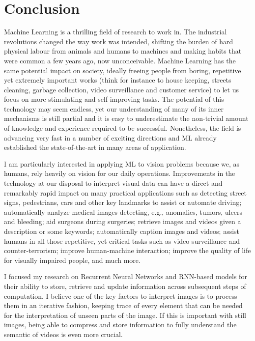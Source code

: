 \chapter{Conclusion}\label{sec:conclusion}

Machine Learning is a thrilling field of research to work in. The industrial
revolutions changed the way work was intended, shifting the burden of hard
physical labour from animals and humans to machines and making habits that were
common a few years ago, now unconceivable. Machine Learning has the same
potential impact on society, ideally freeing people from boring, repetitive
yet extremely important works (think for instance to house keeping, streets
cleaning, garbage collection, video surveillance and customer service) to let
us focus on more stimulating and self-improving tasks. The potential of this
technology may seem endless, yet our understanding of many of its inner
mechanisms is still partial and it is easy to underestimate the non-trivial
amount of knowledge and experience required to be successful.  Nonetheless, the
field is advancing very fast in a number of exciting directions and ML already
established the state-of-the-art in many areas of application.

I am particularly interested in applying ML to vision problems because we, as
humans, rely heavily on vision for our daily operations. Improvements in the
technology at our disposal to interpret visual data can have a direct and
remarkably rapid impact on many practical applications such as detecting
street signs, pedestrians, cars and other key landmarks to assist or automate
driving; automatically analyze medical images detecting, e.g., anomalies,
tumors, ulcers and bleeding; aid surgeons during surgeries; retrieve images and
videos given a description or some keywords; automatically caption images and
videos; assist humans in all those repetitive, yet critical tasks such as video
surveillance and counter-terrorism; improve human-machine interaction; improve
the quality of life for visually impaired people, and much more.

I focused my research on Recurrent Neural Networks and RNN-based models for
their ability to store, retrieve and update information across subsequent steps
of computation. I believe one of the key factors to interpret images is to
process them in an iterative fashion, keeping trace of every element that can
be needed for the interpretation of unseen parts of the image. If this is
important with still images, being able to compress and store information to
fully understand the semantic of videos is even more crucial.

